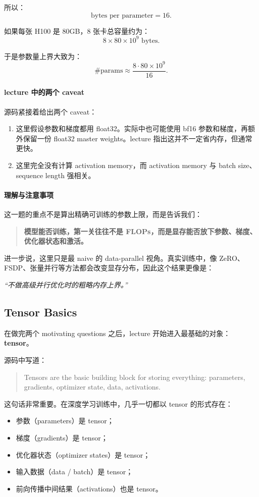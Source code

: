 \documentclass[a4paper,UTF8]{article}
\numberwithin{equation}{section}
\begin{document}
所以：
\[
\text{bytes per parameter} = 16.
\]

如果每张 H100 是 80GB，8 张卡总容量约为：
\[
8 \times 80 \times 10^9 \text{ bytes}.
\]

于是参数量上界大致为：
\[
\#\text{params}
\approx
\frac{8 \cdot 80 \times 10^9}{16}.
\]

\paragraph{lecture 中的两个 caveat}
源码紧接着给出两个 caveat：

\begin{enumerate}
    \item 这里假设参数和梯度都用 float32。实际中也可能使用 bf16 参数和梯度，再额外保留一份 float32 master weights。lecture 指出这并不一定省内存，但通常更快。
    \item 这里完全没有计算 activation memory，而 activation memory 与 batch size、sequence length 强相关。
\end{enumerate}

\paragraph{理解与注意事项}
这一题的重点不是算出精确可训练的参数上限，而是告诉我们：

\begin{quote}
\textbf{模型能否训练，第一关往往不是 FLOPs，而是显存能否放下参数、梯度、优化器状态和激活。}
\end{quote}

进一步说，这里只是最 naive 的 data-parallel 视角。真实训练中，像 ZeRO、FSDP、张量并行等方法都会改变显存分布，因此这个结果更像是：
\begin{center}
\emph{“不做高级并行优化时的粗略内存上界。”}
\end{center}

\subsection{Tensor Basics}

在做完两个 motivating questions 之后，lecture 开始进入最基础的对象：\textbf{tensor}。

源码中写道：
\begin{quote}
Tensors are the basic building block for storing everything: parameters, gradients, optimizer state, data, activations.
\end{quote}

这句话非常重要。在深度学习训练中，几乎一切都以 tensor 的形式存在：
\begin{itemize}
    \item 参数（parameters）是 tensor；
    \item 梯度（gradients）是 tensor；
    \item 优化器状态（optimizer states）是 tensor；
    \item 输入数据（data / batch）是 tensor；
    \item 前向传播中间结果（activations）也是 tensor。
\end{itemize}
\end{document}
